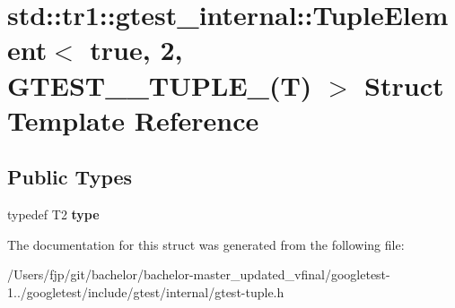 \hypertarget{structstd_1_1tr1_1_1gtest__internal_1_1_tuple_element_3_01true_00_012_00_01_g_t_e_s_t__10___t_u_p_l_e___07_t_08_01_4}{}\section{std\+:\+:tr1\+:\+:gtest\+\_\+internal\+:\+:Tuple\+Element$<$ true, 2, G\+T\+E\+S\+T\+\_\+\_\+\+T\+U\+P\+L\+E\+\_\+(T) $>$ Struct Template Reference}
\label{structstd_1_1tr1_1_1gtest__internal_1_1_tuple_element_3_01true_00_012_00_01_g_t_e_s_t__10___t_u_p_l_e___07_t_08_01_4}
\subsection*{Public Types}
\begin{DoxyCompactItemize}
\item 
\mbox{\label{structstd_1_1tr1_1_1gtest__internal_1_1_tuple_element_3_01true_00_012_00_01_g_t_e_s_t__10___t_u_p_l_e___07_t_08_01_4_a2162d0e4f4c93fb1fdedb1938b844fbe}} 
typedef T2 {\bfseries type}
\end{DoxyCompactItemize}


The documentation for this struct was generated from the following file\+:\begin{DoxyCompactItemize}
\item 
/\+Users/fjp/git/bachelor/bachelor-\/master\+\_\+updated\+\_\+vfinal/googletest-\/1../googletest/include/gtest/internal/gtest-\/tuple.\+h\end{DoxyCompactItemize}
